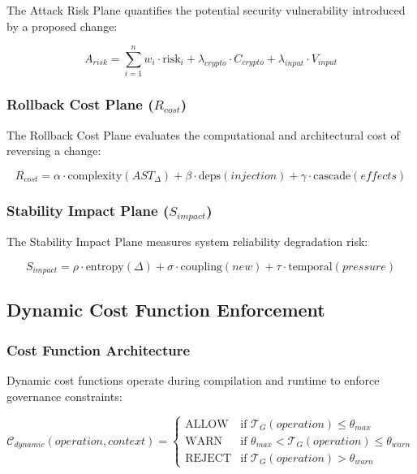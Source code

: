 The Attack Risk Plane quantifies the potential security vulnerability introduced by a proposed change:

\begin{equation}
A_{risk} = \sum_{i=1}^{n} w_i \cdot \text{risk}_i + \lambda_{crypto} \cdot C_{crypto} + \lambda_{input} \cdot V_{input}
\end{equation}

\subsubsection{Rollback Cost Plane ($R_{cost}$)}

The Rollback Cost Plane evaluates the computational and architectural cost of reversing a change:

\begin{equation}
R_{cost} = \alpha \cdot \text{complexity}(AST_{\Delta}) + \beta \cdot \text{deps}(injection) + \gamma \cdot \text{cascade}(effects)
\end{equation}

\subsubsection{Stability Impact Plane ($S_{impact}$)}

The Stability Impact Plane measures system reliability degradation risk:

\begin{equation}
S_{impact} = \rho \cdot \text{entropy}(\Delta) + \sigma \cdot \text{coupling}(new) + \tau \cdot \text{temporal}(pressure)
\end{equation}

\subsection{Dynamic Cost Function Enforcement}

\subsubsection{Cost Function Architecture}

Dynamic cost functions operate during compilation and runtime to enforce governance constraints:

\begin{equation}
\mathcal{C}_{dynamic}(operation, context) = \begin{cases}
\text{ALLOW} & \text{if } \mathcal{T}_G(operation) \leq \theta_{max} \\
\text{WARN} & \text{if } \theta_{max} < \mathcal{T}_G(operation) \leq \theta_{warn} \\
\text{REJECT} & \text{if } \mathcal{T}_G(operation) > \theta_{warn}
\end{cases}
\end{equation}

